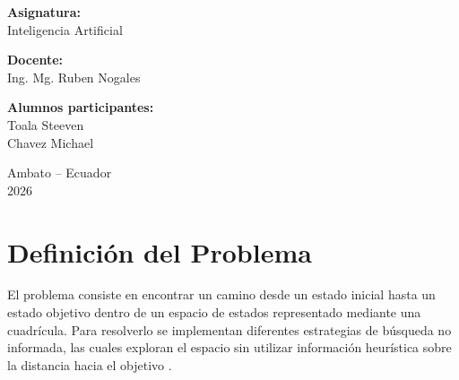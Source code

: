 \documentclass{article}
\begin{document}
\begin{titlepage}
\begin{center}
{        \vspace{0.45cm}

        \textbf{Asignatura:}\\
        Inteligencia Artificial

        \vspace{0.45cm}

        \textbf{Docente:}\\
        Ing. Mg. Ruben Nogales

        \vspace{0.45cm}

        \textbf{Alumnos participantes:}\\
        Toala Steeven\\
        Chavez Michael

        }


        \vfill

        {\large
        Ambato -- Ecuador\\
        2026
        }

    \end{center}

\end{titlepage}


\tableofcontents

\newpage





\section{Definición del Problema}

El problema consiste en encontrar un camino desde un estado inicial
hasta un estado objetivo dentro de un espacio de estados representado
mediante una cuadrícula. Para resolverlo se implementan diferentes
estrategias de búsqueda no informada, las cuales exploran el espacio
sin utilizar información heurística sobre la distancia hacia el
objetivo \cite{russell2021artificial}.
\end{document}

